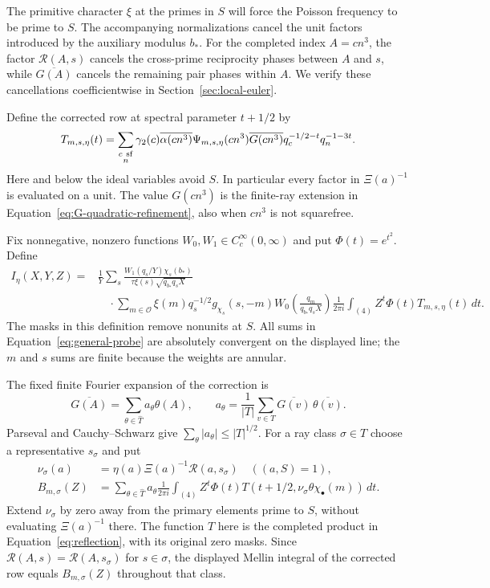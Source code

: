 \documentclass[11pt,a4paper]{article}
\numberwithin{equation}{section}
\numberwithin{figure}{section}
\theoremstyle{definition}
\theoremstyle{remark}
\begin{document}
The primitive character $\xi$ at the primes in $S$ will force the
Poisson frequency to be prime to $S$. The accompanying normalizations
cancel the unit factors introduced by the auxiliary modulus $b_*$.
For the completed index $A=cn^3$, the factor $\mathcal R(A,s)$
cancels the cross-prime reciprocity phases between $A$ and $s$, while
$\overline{G(A)}$ cancels the remaining pair phases within $A$.
We verify these cancellations coefficientwise in
Section~\ref{sec:local-euler}.

Define the corrected row at spectral parameter $t+1/2$ by
\[
 T_{m,s,\eta}(t)=
 \sum_{\substack{c\ {\rm sf}\\n}}
 \gamma_2(c)\overline{\alpha(cn^3)}\Psi_{m,s,\eta}(cn^3)
 \overline{G(cn^3)}q_c^{-1/2-t}q_n^{-1-3t}.
\]
Here and below the ideal variables avoid $S$.  In particular every
factor in $\Xi(a)^{-1}$ is evaluated on a unit.  The value
$G(cn^3)$ is the finite-ray extension in
Equation~\eqref{eq:G-quadratic-refinement}, also when $cn^3$ is not
squarefree.

Fix nonnegative, nonzero functions $W_0,W_1\in C_c^\infty(0,\infty)$
and put $\Phi(t)=e^{t^2}$.  Define
\begin{equation}\label{eq:general-probe}
\begin{aligned}
 I_\eta(X,Y,Z)={}&\frac1Y\sum_s
 \frac{W_1(q_s/Y)\chi_s(b_*)}
      {\tau\xi(s)\sqrt{q_{b_*}q_sX}}\\
 &\quad\cdot\sum_{m\in\mathcal O}
       \xi(m)q_s^{-1/2}g_{\chi_s}(s,-m)
       W_0\!\left(\frac{q_m}{q_{b_*}q_sX}\right)
       \frac1{2\pi i}\int_{(4)}
             Z^t\Phi(t)T_{m,s,\eta}(t)\,dt.
\end{aligned}
\end{equation}
The masks in this definition remove nonunits at $S$.  All sums in
Equation~\eqref{eq:general-probe} are absolutely convergent on the
displayed line; the $m$ and $s$ sums are finite because the weights
are annular.

The fixed finite Fourier expansion of the correction is
\[
 \overline{G(A)}=\sum_{\theta\in\widehat T}a_\theta\theta(A),
 \qquad
 a_\theta=\frac1{|T|}\sum_{v\in T}
                 \overline{G(v)}\,\overline{\theta(v)}.
\]
Parseval and Cauchy--Schwarz give
$\sum_\theta|a_\theta|\le |T|^{1/2}$.  For a ray class
$\sigma\in T$ choose a representative $s_\sigma$ and put
\[
 \begin{aligned}
 \nu_\sigma(a)&=\eta(a)\Xi(a)^{-1}\mathcal R(a,s_\sigma)
       \quad ((a,S)=1),\\
 B_{m,\sigma}(Z)&=\sum_{\theta\in\widehat T}a_\theta
 \frac1{2\pi i}\int_{(4)}Z^t\Phi(t)
       T(t+1/2,\nu_\sigma\theta\chi_\bullet(m))\,dt.
 \end{aligned}
\]
Extend $\nu_\sigma$ by zero away from the primary elements prime to $S$, without
evaluating $\Xi(a)^{-1}$ there.  The function $T$ here is the completed
product in
Equation~\eqref{eq:reflection}, with its original zero masks.
Since $\mathcal R(A,s)=\mathcal R(A,s_\sigma)$ for $s\in\sigma$,
the displayed Mellin integral of the corrected row equals
$B_{m,\sigma}(Z)$ throughout that class.
\end{document}

